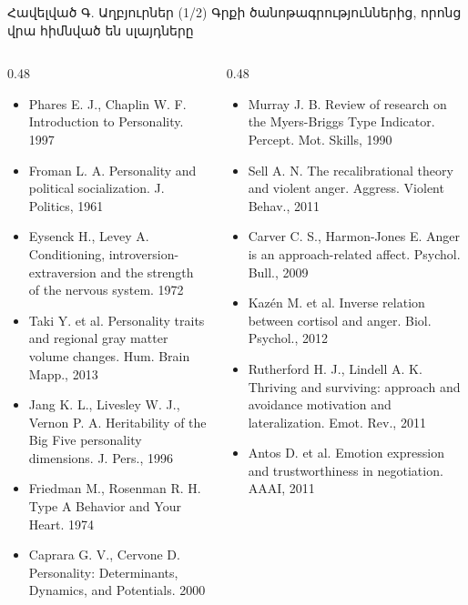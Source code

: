 \begin{frame}{Հավելված Գ. Աղբյուրներ (1/2)}
  \scriptsize
  Գրքի ծանոթագրություններից, որոնց վրա հիմնված են սլայդները\par\smallskip
  \begin{columns}[T]
    \begin{column}{0.48\textwidth}
      \begin{itemize}\setlength{\itemsep}{0.4mm}
        \item Phares E. J., Chaplin W. F. Introduction to Personality. 1997
        \item Froman L. A. Personality and political socialization. J. Politics, 1961
        \item Eysenck H., Levey A. Conditioning, introversion-extraversion and the strength of the nervous system. 1972
        \item Taki Y. et al. Personality traits and regional gray matter volume changes. Hum. Brain Mapp., 2013
        \item Jang K. L., Livesley W. J., Vernon P. A. Heritability of the Big Five personality dimensions. J. Pers., 1996
        \item Friedman M., Rosenman R. H. Type A Behavior and Your Heart. 1974
        \item Caprara G. V., Cervone D. Personality: Determinants, Dynamics, and Potentials. 2000
      \end{itemize}
    \end{column}
    \begin{column}{0.48\textwidth}
      \begin{itemize}\setlength{\itemsep}{0.4mm}
        \item Murray J. B. Review of research on the Myers-Briggs Type Indicator. Percept. Mot. Skills, 1990
        \item Sell A. N. The recalibrational theory and violent anger. Aggress. Violent Behav., 2011
        \item Carver C. S., Harmon-Jones E. Anger is an approach-related affect. Psychol. Bull., 2009
        \item Kazén M. et al. Inverse relation between cortisol and anger. Biol. Psychol., 2012
        \item Rutherford H. J., Lindell A. K. Thriving and surviving: approach and avoidance motivation and lateralization. Emot. Rev., 2011
        \item Antos D. et al. Emotion expression and trustworthiness in negotiation. AAAI, 2011
      \end{itemize}
    \end{column}
  \end{columns}
\end{frame}


